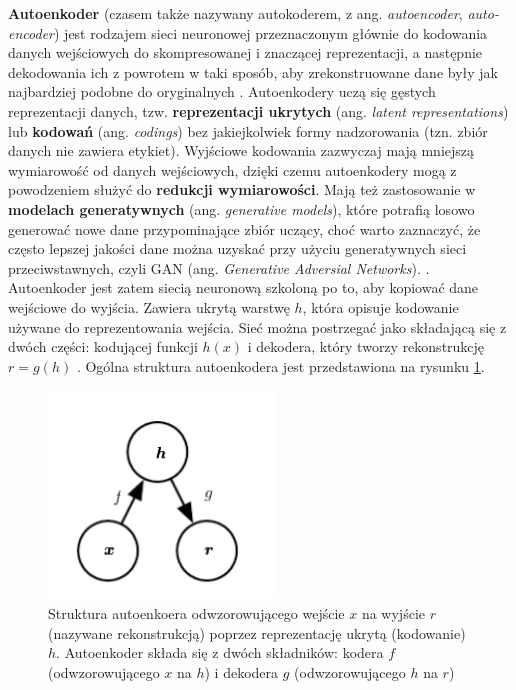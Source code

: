 \documentclass[12pt]{mwbk}
\theoremstyle{plain}
\theoremstyle{definition}
\theoremstyle{remark}
\newcommand\zrodlo[1]{\par\vspace{-3mm}{\small\textit{Źródło: }#1 }}
\begin{document}
	\textbf{Autoenkoder} (czasem także nazywany autokoderem, z ang. \textit{autoencoder}, \textit{auto-encoder}) jest rodzajem sieci neuronowej przeznaczonym głównie do kodowania danych wejściowych do skompresowanej i znaczącej reprezentacji, a następnie dekodowania ich z powrotem w taki sposób, aby zrekonstruowane dane były jak najbardziej podobne do oryginalnych \cite{bank}. Autoenkodery uczą się gęstych reprezentacji danych, tzw. \textbf{reprezentacji ukrytych} (ang. \emph{latent representations}) lub \textbf{kodowań} (ang. \emph{codings}) bez jakiejkolwiek formy nadzorowania (tzn. zbiór danych nie zawiera etykiet). Wyjściowe kodowania zazwyczaj mają mniejszą wymiarowość od danych wejściowych, dzięki czemu autoenkodery mogą z powodzeniem służyć do \textbf{redukcji wymiarowości}. Mają też zastosowanie w \textbf{modelach generatywnych} (ang. \emph{generative models}), które potrafią losowo generować nowe dane przypominające zbiór uczący, choć warto zaznaczyć, że często lepszej jakości dane można uzyskać przy użyciu generatywnych sieci przeciwstawnych, czyli GAN (ang. \textit{Generative Adversial Networks}).  \cite{geron}. Autoenkoder jest zatem siecią neuronową szkoloną po to, aby kopiować dane wejściowe do wyjścia. Zawiera ukrytą warstwę $h$, która opisuje kodowanie używane do reprezentowania wejścia. Sieć można postrzegać jako składającą się z dwóch części: kodującej funkcji $h(x)$ i dekodera, który tworzy rekonstrukcję $r=g(h)$  \cite{goodfellow}. Ogólna struktura autoenkodera jest przedstawiona na rysunku \ref{fig:autoencoder_structue}.

\begin{figure}[!h]
	\centering
	\includegraphics[width=6cm]{rys/autoencoder_structure.png}
	\caption{
		Struktura autoenkoera odwzorowującego wejście $x$ na wyjście $r$ (nazywane rekonstrukcją) poprzez reprezentację ukrytą (kodowanie) $h$. Autoenkoder składa się z dwóch składników: kodera $f$ (odwzorowującego $x$ na $h$) i dekodera $g$ (odwzorowującego $h$ na $r$)}
	\zrodlo{\cite{goodfellow}}
	\label{fig:autoencoder_structue}
\end{figure}
\end{document}

